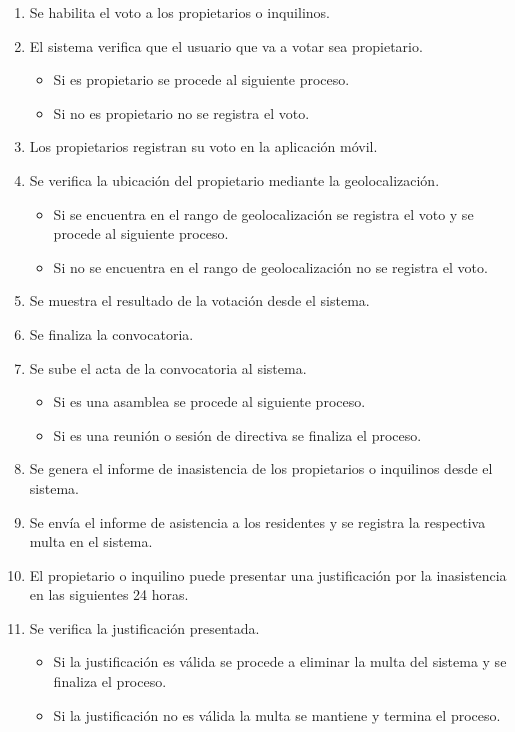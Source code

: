 \begin{itemize}
\begin{enumerate}
        \item Se habilita el voto a los propietarios o inquilinos.
        \item El sistema verifica que el usuario que va a votar sea propietario.
        \begin{itemize}
            \item Si es propietario se procede al siguiente proceso.
            \item Si no es propietario no se registra el voto.
        \end{itemize}
        \item Los propietarios registran su voto en la aplicación móvil.
        \item Se verifica la ubicación del propietario mediante la geolocalización.
        \begin{itemize}
            \item Si se encuentra en el rango de geolocalización se registra el voto y se procede al siguiente proceso.
            \item Si no se encuentra en el rango de geolocalización no se registra el voto.
        \end{itemize}
        \item Se muestra el resultado de la votación desde el sistema.
        \item Se finaliza la convocatoria.
        \item Se sube el acta de la convocatoria al sistema.
        \begin{itemize}
            \item Si es una asamblea se procede al siguiente proceso.
            \item Si es una reunión o sesión de directiva se finaliza el proceso.
        \end{itemize}
        \item Se genera el informe de inasistencia de los propietarios o inquilinos desde el sistema.
        \item Se envía el informe de asistencia a los residentes y se registra la respectiva multa en el sistema.
        \item El propietario o inquilino puede presentar una justificación por la inasistencia en las siguientes 24 horas.
        \item Se verifica la justificación presentada.
        \begin{itemize}
            \item Si la justificación es válida se procede a eliminar la multa del sistema y se finaliza el proceso.
            \item Si la justificación no es válida la multa se mantiene y termina el proceso.
        \end{itemize}
    \end{enumerate}



\end{itemize}
